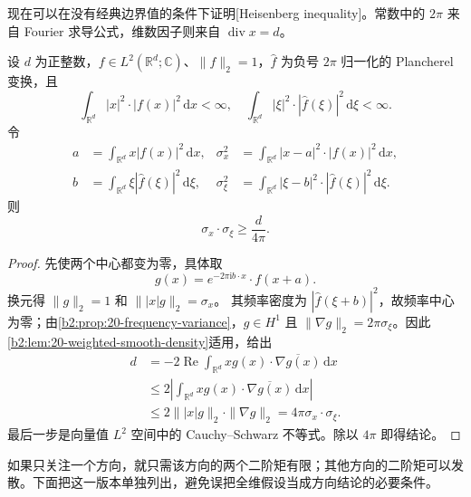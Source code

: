 现在可以在没有经典边界值的条件下证明[Heisenberg inequality]。常数中的 \(2\pi\) 来自 Fourier 求导公式，维数因子则来自 \(\operatorname{div}x=d\)。

\begin{theorem}[Heisenberg]\label{b2:thm:20-heisenberg}
设 \(d\) 为正整数，\(f\in L^2(\mathbb R^d;\mathbb C)\)、\(\|f\|_2=1\)，\(\widehat f\) 为负号 \(2\pi\) 归一化的 Plancherel 变换，且
\[
 \int_{\mathbb R^d}|x|^2\cdot|f(x)|^2\,\mathrm dx<\infty,
 \quad
 \int_{\mathbb R^d}|\xi|^2\cdot|\widehat f(\xi)|^2\,\mathrm d\xi<\infty.
\]
令
\[
 \begin{aligned}
 a&=\int_{\mathbb R^d}x|f(x)|^2\,\mathrm dx,
 &\sigma_x^2&=\int_{\mathbb R^d}|x-a|^2\cdot|f(x)|^2\,\mathrm dx,\\
 b&=\int_{\mathbb R^d}\xi|\widehat f(\xi)|^2\,\mathrm d\xi,
 &\sigma_\xi^2&=\int_{\mathbb R^d}|\xi-b|^2\cdot|\widehat f(\xi)|^2\,\mathrm d\xi.
 \end{aligned}
\]
则
\[
 \sigma_x\cdot\sigma_\xi\geq\frac d{4\pi}.
\]
\end{theorem}
\begin{proof}
先使两个中心都变为零，具体取
\[
 g(x)=e^{-2\pi\mathrm i b\cdot x}\cdot f(x+a).
\]
换元得 \(\|g\|_2=1\) 和
\(\bigl\||x|g\bigr\|_2=\sigma_x\)。
其频率密度为 \(|\widehat f(\xi+b)|^2\)，故频率中心为零；由\cref{b2:prop:20-frequency-variance}，\(g\in H^1\) 且 \(\|\nabla g\|_2=2\pi\sigma_\xi\)。因此\cref{b2:lem:20-weighted-smooth-density}适用，给出
\[
 \begin{aligned}
 d
 &=-2\operatorname{Re}\int_{\mathbb R^d}
        xg(x)\cdot\overline{\nabla g(x)}\,\mathrm dx\\
 &\leq2\left|\int_{\mathbb R^d}
        xg(x)\cdot\overline{\nabla g(x)}\,\mathrm dx\right|\\
 &\leq2\bigl\||x|g\bigr\|_2\cdot\|\nabla g\|_2
 =4\pi\sigma_x\cdot\sigma_\xi.
 \end{aligned}
\]
最后一步是向量值 \(L^2\) 空间中的 Cauchy--Schwarz 不等式。除以 \(4\pi\) 即得结论。
\end{proof}

如果只关注一个方向，就只需该方向的两个二阶矩有限；其他方向的二阶矩可以发散。下面把这一版本单独列出，避免误把全维假设当成方向结论的必要条件。

